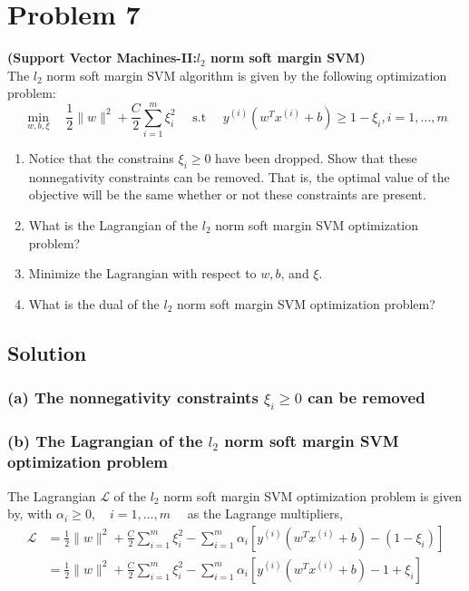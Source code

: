 \section*{Problem 7}

\textbf{(Support Vector Machines-II:\@ \( l_{2}
    \) norm soft margin SVM)}\\
The \( l_{2} \) norm soft margin SVM algorithm is given by the following optimization problem:
\[
    \min _{w, b, \xi} \quad \frac{1}{2}\|w\|^{2}+\frac{C}{2} \sum_{i=1}^{m} \xi_{i}^{2} \quad \text { s.t } \quad y^{(i)}\left(w^{T} x^{(i)}+b\right) \geq 1-\xi_{i}, i=1, \ldots, m
\]
\begin{enumerate}[label= (\alph*), noitemsep, topsep=0pt]
    \item Notice that the constrains \( \xi_{i} \geq 0 \) have been dropped.
          Show that these nonnegativity constraints can be removed.
          That is, the optimal value of the objective will be the same whether or not these constraints are present.

    \item What is the Lagrangian of the \( l_{2} \) norm soft margin SVM optimization problem?

    \item Minimize the Lagrangian with respect to \( w, b \), and \( \xi \).

    \item What is the dual of the \( l_{2} \) norm soft margin SVM optimization problem?
\end{enumerate}

\subsection*{Solution}

\subsubsection*{(a) The nonnegativity constraints \( \xi_{i} \geq 0 \) can be removed}

\subsubsection*{(b) The Lagrangian of the \( l_{2} \) norm soft margin SVM optimization problem}

The Lagrangian \( \mathcal{L} \) of the \( l_{2} \) norm soft margin SVM optimization problem is given by, with \( \alpha_{i} \geq 0, \quad i = 1, \ldots, m \quad \) as the Lagrange multipliers,
\begin{align*}
    \mathcal{L}
     & =
    \frac{1}{2}\|w\|^{2}+\frac{C}{2} \sum_{i=1}^{m} \xi_{i}^{2}
    - \sum_{i=1}^{m} \alpha_{i} \left[ y^{(i)}\left(w^{T} x^{(i)}+b\right) - (1-\xi_{i}) \right]
    \\ & =
    \frac{1}{2}\|w\|^{2}+\frac{C}{2} \sum_{i=1}^{m} \xi_{i}^{2}
    - \sum_{i=1}^{m} \alpha_{i} \left[ y^{(i)}\left(w^{T} x^{(i)}+b\right) - 1 + \xi_{i} \right]
\end{align*}

